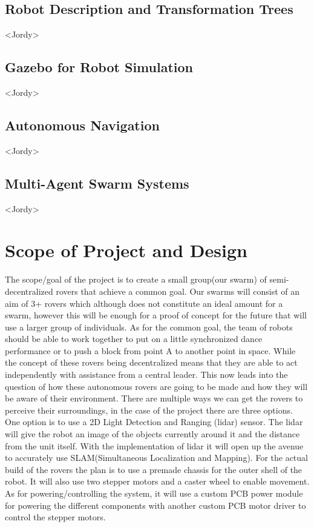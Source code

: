 \documentclass[conference]{IEEEtran}
\begin{document}
\subsection{Robot Description and Transformation Trees} <Jordy>

\subsection{Gazebo for Robot Simulation} <Jordy>

\subsection{Autonomous Navigation} <Jordy>

\subsection{Multi-Agent Swarm Systems} <Jordy>

\section{Scope of Project and Design}The scope/goal of the project is to create a small group(our swarm) of semi-decentralized rovers that achieve a common goal. Our swarms will consist of an aim of 3+ rovers which although does not constitute an ideal amount for a swarm, however this will be enough for a proof of concept for the future that will use a larger group of individuals. As for the common goal, the team of robots should be able to work together to put on a little synchronized dance performance or to push a block from point A to another point in space. While the concept of these rovers being decentralized means that they are able to act independently with assistance from a central leader. This now leads into the question of how these autonomous rovers are going to be made and how they will be aware of their environment.
There are multiple ways we can get the rovers to perceive their surroundings, in the case of the project there are three options. One option is to use a 2D Light Detection and Ranging (lidar) sensor. The lidar will give the robot an image of the objects currently around it and the distance from the unit itself. With the implementation of lidar it will open up the avenue to accurately use SLAM(Simultaneous Localization and Mapping). For the actual build of the rovers the plan is to use a premade chassis for the outer shell of the robot. It will also use two stepper motors and a caster wheel to enable movement. As for powering/controlling the system, it will use a custom PCB power module for powering the different components with another custom PCB motor driver to control the stepper motors.
\end{document}
